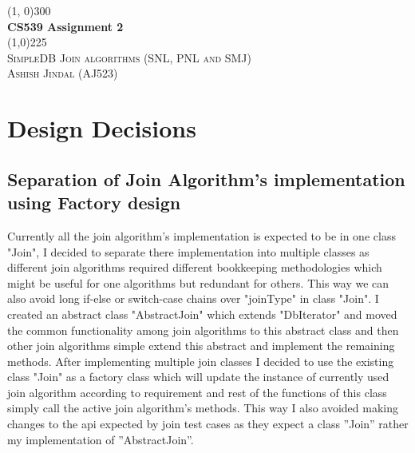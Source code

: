\documentclass{article}
\begin{document}
\begin{titlepage}
\begin{center}

\line(1, 0){300}\\
[4mm]
\huge{\bfseries CS539 Assignment 2}\\
\line(1,0){225}\\
[4mm]
\textsc{\Large SimpleDB Join algorithms (SNL, PNL and SMJ)}\\
\textsc{\large Ashish Jindal (AJ523)}

\end{center}	

\section{Design Decisions}
\subsection{Separation of Join Algorithm's implementation using Factory design}
Currently all the join algorithm's implementation is expected to be in one class "Join", I decided to separate there implementation into multiple classes as different join algorithms required different bookkeeping methodologies which might be useful for one algorithms but redundant for others. This way we can also avoid long if-else or switch-case chains over "joinType" in class "Join". I created an abstract class "AbstractJoin" which extends "DbIterator" and moved the common functionality among join algorithms to this abstract class and then other join algorithms simple extend this abstract and implement the remaining methods. After implementing multiple join classes I decided to use the existing class "Join" as a factory class which will update the instance of currently used join algorithm according to requirement and rest of the functions of this class simply call
the active join algorithm's methods. This way I also avoided making changes to the api expected by join test cases as they expect a class ”Join” rather my implementation of ”AbstractJoin”.



\end{titlepage}
\end{document}

